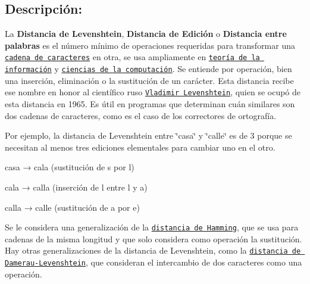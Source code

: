 \subsection*{Descripción\+:}

La {\bfseries Distancia de Levenshtein}, {\bfseries Distancia de Edición} o {\bfseries Distancia entre palabras} es el número mínimo de operaciones requeridas para transformar una \href{https://es.wikipedia.org/wiki/Cadena_de_caracteres}{\tt cadena de caracteres} en otra, se usa ampliamente en \href{https://es.wikipedia.org/wiki/Teor%C3%ADa_de_la_informaci%C3%B3n}{\tt teoría de la información} y \href{https://es.wikipedia.org/wiki/Ciencias_de_la_computaci%C3%B3n}{\tt ciencias de la computación}. Se entiende por operación, bien una inserción, eliminación o la sustitución de un carácter. Esta distancia recibe ese nombre en honor al científico ruso \href{https://es.wikipedia.org/wiki/Vlad%C3%ADmir_Levensht%C3%A9in}{\tt Vladimir Levenshtein}, quien se ocupó de esta distancia en 1965. Es útil en programas que determinan cuán similares son dos cadenas de caracteres, como es el caso de los correctores de ortografía.

Por ejemplo, la distancia de Levenshtein entre \char`\"{}casa\char`\"{} y \char`\"{}calle\char`\"{} es de 3 porque se necesitan al menos tres ediciones elementales para cambiar uno en el otro.


\begin{DoxyItemize}
\item casa → cala (sustitución de \textquotesingle{}s\textquotesingle{} por \textquotesingle{}l\textquotesingle{})
\item cala → calla (inserción de \textquotesingle{}l\textquotesingle{} entre \textquotesingle{}l\textquotesingle{} y \textquotesingle{}a\textquotesingle{})
\item calla → calle (sustitución de \textquotesingle{}a\textquotesingle{} por \textquotesingle{}e\textquotesingle{})
\end{DoxyItemize}

Se le considera una generalización de la \href{https://es.wikipedia.org/wiki/Distancia_de_Hamming}{\tt distancia de Hamming}, que se usa para cadenas de la misma longitud y que solo considera como operación la sustitución. Hay otras generalizaciones de la distancia de Levenshtein, como la \href{https://es.wikipedia.org/wiki/Distancia_de_Damerau-Levenshtein}{\tt distancia de Damerau-\/\+Levenshtein}, que consideran el intercambio de dos caracteres como una operación.

